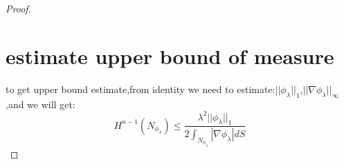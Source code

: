 \documentclass[11pt]{article}
\newtheorem{proof}{proof}
\begin{document}
\begin{proof}
\section{estimate upper bound of measure}
to get upper bound estimate,from identity we need to estimate:$||\phi_{\lambda}||_1$,$||\nabla\phi_{\lambda}||_{\infty}$,and we will get:
\[H^{n-1}(N_{\phi_{\lambda}}) \leq \frac{\lambda^2||\phi_{\lambda}||_1}{2\int_{N_{\phi_{\lambda}}} |\nabla\phi_{\lambda}|dS}\]












\end{proof}
\end{document}
